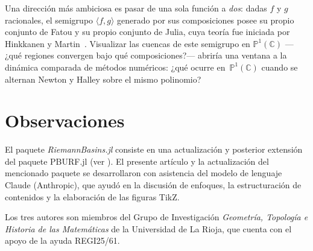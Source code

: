 \documentclass[11pt,a4paper]{article}
\theoremstyle{plain}
\theoremstyle{definition}
\theoremstyle{remark}
\newcommand{\Puno}{\mathbb{P}^1(\mathbb{C})}
\newcommand{\pkg}[1]{\textsl{#1}}
\begin{document}
Una dirección más ambiciosa es pasar de una sola función a
\emph{dos}: dadas $f$ y $g$ racionales, el semigrupo
$\langle f,g\rangle$ generado por sus composiciones posee su propio
conjunto de Fatou y su propio conjunto de Julia, cuya teoría fue
iniciada por Hinkkanen y Martin~\cite{HinkkanenMartin1996}.
Visualizar las cuencas de este semigrupo en $\Puno$ —¿qué regiones
convergen bajo qué composiciones?— abriría una ventana a la dinámica
comparada de métodos numéricos: ¿qué ocurre en~$\Puno$
cuando se alternan Newton y Halley sobre el mismo polinomio?

\section*{Observaciones}


El paquete \pkg{RiemannBasins.jl} consiste en una actualización y posterior extensión del paquete 
PBURF.jl (ver \cite{PBURF2019}).
El presente artículo y la actualización del mencionado paquete   se
desarrollaron con asistencia del modelo de lenguaje Claude
(Anthropic), que ayudó en la discusión de enfoques,
la estructuración de contenidos y la elaboración de las figuras
TikZ.

Los tres autores son miembros del Grupo de Investigación
\emph{Geometría, Topología e Historia de las Matemáticas} de la Universidad de La Rioja,
que cuenta con el apoyo de la ayuda REGI25/61.
\end{document}
